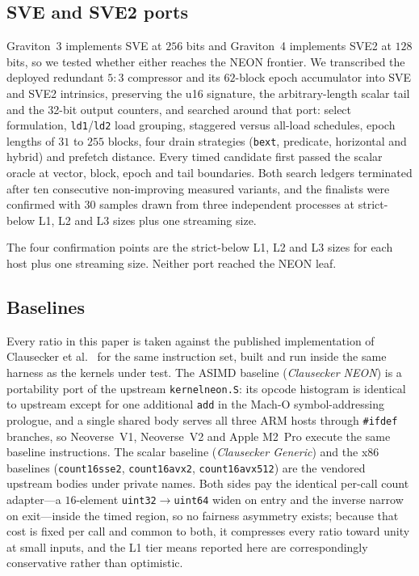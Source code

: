 \documentclass[fleqn,10pt]{wlscirep}
\begin{document}
\subsection*{SVE and SVE2 ports}
Graviton~3 implements SVE at $256$ bits and Graviton~4 implements SVE2 at $128$ bits, so we tested whether either reaches the NEON frontier. We transcribed the deployed redundant $5{:}3$ compressor and its $62$-block epoch accumulator into SVE and SVE2 intrinsics, preserving the u16 signature, the arbitrary-length scalar tail and the 32-bit output counters, and searched around that port: select formulation, \texttt{ld1}/\texttt{ld2} load grouping, staggered versus all-load schedules, epoch lengths of $31$ to $255$ blocks, four drain strategies (\texttt{bext}, predicate, horizontal and hybrid) and prefetch distance. Every timed candidate first passed the scalar oracle at vector, block, epoch and tail boundaries. Both search ledgers terminated after ten consecutive non-improving measured variants, and the finalists were confirmed with $30$ samples drawn from three independent processes at strict-below L1, L2 and L3 sizes plus one streaming size.

The four confirmation points are the strict-below L1, L2 and L3 sizes for each host plus one streaming size. Neither port reached the NEON leaf.

\subsection*{Baselines}
Every ratio in this paper is taken against the published implementation of Clausecker et al.~\cite{clausecker2024} for the same instruction set, built and run inside the same harness as the kernels under test. The ASIMD baseline (\emph{Clausecker NEON}) is a portability port of the upstream \texttt{kernelneon.S}: its opcode histogram is identical to upstream except for one additional \texttt{add} in the Mach-O symbol-addressing prologue, and a single shared body serves all three ARM hosts through \texttt{\#ifdef} branches, so Neoverse~V1, Neoverse~V2 and Apple M2~Pro execute the same baseline instructions. The scalar baseline (\emph{Clausecker Generic}) and the x86 baselines (\texttt{count16sse2}, \texttt{count16avx2}, \texttt{count16avx512}) are the vendored upstream bodies under private names. Both sides pay the identical per-call count adapter---a $16$-element \texttt{uint32}$\rightarrow$\texttt{uint64} widen on entry and the inverse narrow on exit---inside the timed region, so no fairness asymmetry exists; because that cost is fixed per call and common to both, it compresses every ratio toward unity at small inputs, and the L1 tier means reported here are correspondingly conservative rather than optimistic.
\end{document}
